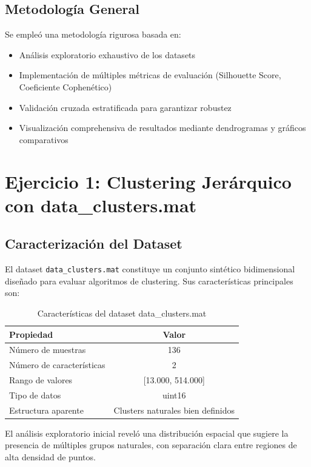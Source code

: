 \documentclass[12pt,a4paper]{article}
\begin{document}
\subsection{Metodología General}
Se empleó una metodología rigurosa basada en:
\begin{itemize}
    \item Análisis exploratorio exhaustivo de los datasets
    \item Implementación de múltiples métricas de evaluación (Silhouette Score, Coeficiente Cophenético)
    \item Validación cruzada estratificada para garantizar robustez
    \item Visualización comprehensiva de resultados mediante dendrogramas y gráficos comparativos
\end{itemize}

\section{Ejercicio 1: Clustering Jerárquico con data\_clusters.mat}

\subsection{Caracterización del Dataset}
El dataset \texttt{data\_clusters.mat} constituye un conjunto sintético bidimensional diseñado para evaluar algoritmos de clustering. Sus características principales son:

\begin{table}[H]
\centering
\begin{tabular}{|l|c|}
\hline
\textbf{Propiedad} & \textbf{Valor} \\
\hline
Número de muestras & 136 \\
Número de características & 2 \\
Rango de valores & [13.000, 514.000] \\
Tipo de datos & uint16 \\
Estructura aparente & Clusters naturales bien definidos \\
\hline
\end{tabular}
\caption{Características del dataset data\_clusters.mat}
\end{table}

El análisis exploratorio inicial reveló una distribución espacial que sugiere la presencia de múltiples grupos naturales, con separación clara entre regiones de alta densidad de puntos.
\end{document}
